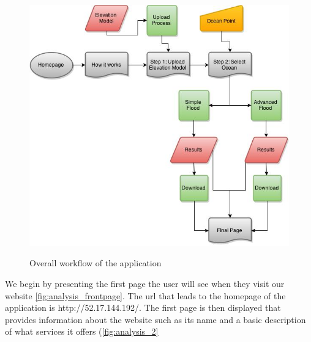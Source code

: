 \begin{figure}[h!]
\centering
	{\includegraphics[height=0.33\textheight]{gfx/Analysis_Website/1.jpg}}
\caption{Overall workflow of the application}
\label{fig:analysis_1}
\end{figure}

We begin by presenting the first page the user will see when they visit our website \autoref{fig:analysis_frontpage}. The url that leads to the homepage of the application is http://52.17.144.192/. The first page is then displayed that provides information about the website such as its name and a basic description of what services it offers (\autoref{fig:analysis_2}

